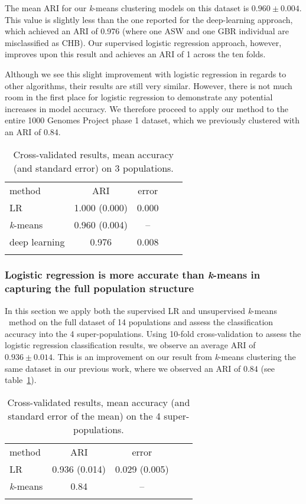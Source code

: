 \documentclass{llncs}
\newcommand{\kMeans}{\textit{k}-means }
\begin{document}
{The mean ARI for our \kMeans{} clustering models on this dataset is \(0.960 \pm 0.004 \). 
This value is slightly less than the one reported for the deep-learning approach, which achieved an ARI of 0.976 (where one ASW and one GBR individual are misclassified as CHB). 
Our supervised logistic regression approach, however, improves upon this result and achieves an ARI of 1 across the ten folds.

Although we see this slight improvement with logistic regression in regards to other algorithms, their results are still very similar.
However, there is not much room in the first place for logistic regression to demonstrate any potential increases in model accuracy.
We therefore proceed to apply our method to the entire 1000 Genomes Project phase 1 dataset, which we previously clustered with an ARI of 0.84.


\begin{table}
\caption{Cross-validated results, mean accuracy (and standard error) on 3 populations.}
\begin{center}
\renewcommand{\arraystretch}{1.4}
\setlength\tabcolsep{3pt}
\begin{tabular}{lcccc}
\hline\noalign{\smallskip}
method  & ARI & error \\
LR  & 1.000 (0.000) & 0.000 \\
\kMeans & 0.960 (0.004) & -- \\
deep learning & 0.976 & 0.008 \\
\noalign{\smallskip}
\hline
\end{tabular}
\end{center}
\end{table}

\subsubsection{Logistic regression is more accurate than \kMeans{} in capturing the full population structure}
In this section we apply both the supervised LR and unsupervised \kMeans\ method on the full dataset of 14 populations and assess the 
classification accuracy into the 4 super-populations.
Using 10-fold cross-validation to assess the logistic regression classification results, we observe an average ARI of \(0.936 \pm{} 0.014\).
This is an improvement on our result from \kMeans{} clustering the same dataset in our previous work, where we observed an ARI of \(0.84\) (see table~\ref{ALLCHR}).

\begin{table}
\caption{Cross-validated results, mean accuracy (and standard error of the mean) on the 4 super-populations.}
\begin{center}
\renewcommand{\arraystretch}{1.4}
\setlength\tabcolsep{3pt}
\begin{tabular}{lcccc}
\hline\noalign{\smallskip}
method  & ARI & error \\
LR  & 0.936 (0.014) & 0.029 (0.005) \\
\kMeans & 0.84 & -- \\
\noalign{\smallskip}
\hline
\label{ALLCHR}
\end{tabular}
\end{center}
\end{table}

}
\end{document}
